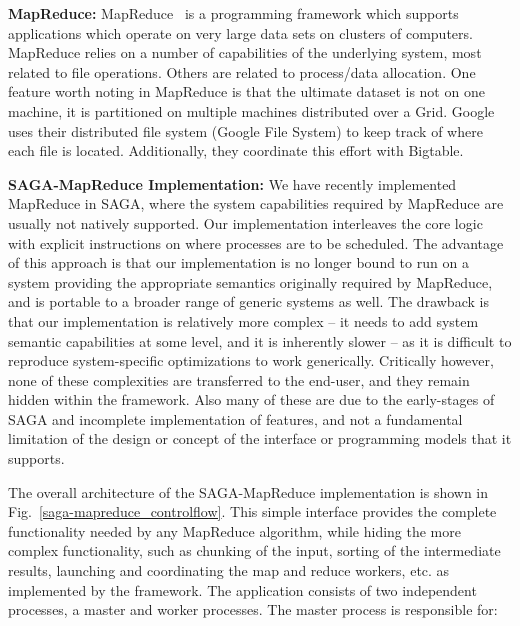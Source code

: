 \documentclass[conference,final]{IEEEtran}
\begin{document}
{\bf MapReduce: } MapReduce~\cite{mapreduce-paper} is a programming
framework which supports applications which operate on very large data
sets on clusters of computers.  MapReduce relies on a number of
capabilities of the underlying system, most related to file
operations.  Others are related to process/data
allocation. %
One feature worth noting in MapReduce is that the ultimate dataset is
not on one machine, it is partitioned on multiple machines distributed
over a Grid. Google uses their distributed file system (Google File
System) to keep track of where each file is located.  Additionally,
they coordinate this effort with Bigtable.

{\bf SAGA-MapReduce Implementation:} We have recently implemented
MapReduce in SAGA, where the system capabilities required by MapReduce
are usually not natively supported. Our implementation interleaves the
core logic with explicit instructions on where processes are to be
scheduled.  The advantage of this approach is that our implementation
is no longer bound to run on a system providing the appropriate
semantics originally required by MapReduce, and is portable to a
broader range of generic systems as well.  The drawback is that our
implementation is relatively more complex -- it needs to add system
semantic capabilities at some level, and it is inherently slower -- as
it is difficult to reproduce system-specific optimizations to work
generically.
Critically however, none of these complexities are transferred to the
end-user, and they remain hidden within the framework. Also many of
these are due to the early-stages of SAGA and incomplete
implementation of features, and not a fundamental limitation of the
design or concept of the interface or programming models that it
supports.

The overall architecture of the SAGA-MapReduce implementation is shown
in Fig.~\ref{saga-mapreduce_controlflow}. This simple interface
provides the complete functionality needed by any MapReduce algorithm,
while hiding the more complex functionality, such as chunking of the
input, sorting of the intermediate results, launching and coordinating
the map and reduce workers, etc. as implemented by the framework.  The
application consists of two independent processes, a master and worker
processes. The master process is responsible for:
\end{document}
